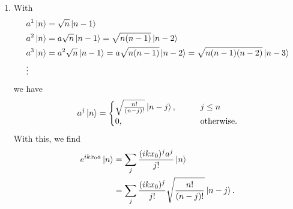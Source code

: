\documentclass{article}
\theoremstyle{definition}
\newcommand{\f}[2]{\frac{#1}{#2}}
\begin{document}
\begin{enumerate}[label = (\alph*)]
	
	\item With
	\begin{align*}
	&a^1\ket{n} = \sqrt{n} \ket{n-1} \\
	&a^2\ket{n} = a\sqrt{n}\ket{n-1} = \sqrt{n(n-1)}\ket{n-2}\\
	&a^3\ket{n} = a^2\sqrt{n}\ket{n-1} = a\sqrt{n(n-1)}\ket{n-2} = \sqrt{n(n-1)(n-2)}\ket{n-3}\\
	&\vdots
	\end{align*}
	we have 
	\begin{align*}
	a^j\ket{n} = 
	\begin{cases}
	\sqrt{\f{n!}{(n-j)!}} \ket{n-j}, &\quad\quad j \leq n\\
	0, &\quad\quad \text{otherwise.}
	\end{cases}
	\end{align*}
	With this, we find
	\begin{align*}
	e^{ikx_0 a}\ket{n} 
	&= \sum_j \f{(ikx_0)^j a^j}{j!}\ket{n} \\
	&= \sum_j \f{(ikx_0)^j }{j!} \sqrt{\f{n!}{(n-j)!}} \ket{n-j}.
	\end{align*}
	

\end{enumerate}
\end{document}
